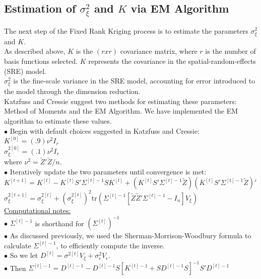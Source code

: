 \documentclass[11pt]{article}
\newcommand{\myindent}{\hspace*{1cm}}
\begin{document}
\subsection{Estimation of $\sigma^2_{\xi}$ and $K$ via EM Algorithm}

The next step of the Fixed Rank Kriging process is to estimate the parameters $\sigma^2_{\xi}$ and $K$.  \\

As described above, $K$ is the $(r x r)$ covariance matrix, where $r$ is the number of basis functions selected.  $K$ represents the covariance in the spatial-random-effects (SRE) model.\\

$\sigma^2_{\xi}$ is the fine-scale variance in the SRE model, accounting for error introduced to the model through the dimension reduction. \\

Katzfuss and Cressie suggest two methods for estimating these parameters: Method of Moments and the EM Algorithm.  We have implemented the EM algorithm to estimate these values.\\

\myindent $\bullet$ Begin with default choices suggested in Katzfuss and Cressie: \\

\myindent \myindent $K^{[0]} = (.9)\nu ^2 I_r$ \\
\myindent \myindent $\sigma_\xi^{2[0]} = (.1)\nu ^2 I_r$ \\
\myindent \myindent \myindent where $\nu^2 = \tilde{Z}'\tilde{Z}/n$.\\

\myindent $\bullet$ Iteratively update the two parameters until convergence is met:\\

\myindent \myindent $K^{[t+1]} = K^{[t]} - K^{[t]} S' \Sigma^{[t]-1}SK^{[t]}
  + \left(K^{[t]}S' \Sigma^{[t]-1} \tilde{Z} \right)\left(K^{[t]}S' \Sigma^{[t]-1} \tilde{Z} \right)'$ \\
\myindent \myindent $\sigma_\xi^{2[t+1]} = \sigma_\xi^{2[t]} + \left(\sigma_\xi^{2[t]} \right)^2 \text{tr} \left(\Sigma^{[t]-1}[\tilde{Z}\tilde{Z}'\Sigma^{[t]-1} - I_n]V_\xi \right)$\\

\underline{Computational notes:} \\
\myindent $\bullet$ $\Sigma^{[t]-1}$ is shorthand for $(\Sigma^{[t]})^{-1}$ \\
\myindent $\bullet$ As discussed previously, we used the Sherman-Morrison-Woodbury formula to  \\ \myindent \myindent calculate $\Sigma^{[t]-1}$, to efficiently compute the inverse.\\
\myindent $\bullet$ So we let $D^{[t]} = \sigma^{2[t]}V_\xi + \sigma^2_\epsilon V_\epsilon$. \\
\myindent $\bullet$ Then $\Sigma^{[t]-1} = D^{[t]-1} -  D^{[t]-1}S[K^{[t]-1} + SD^{[t]-1}S]^{-1}S'D^{[t]-1}$\\
\end{document}
